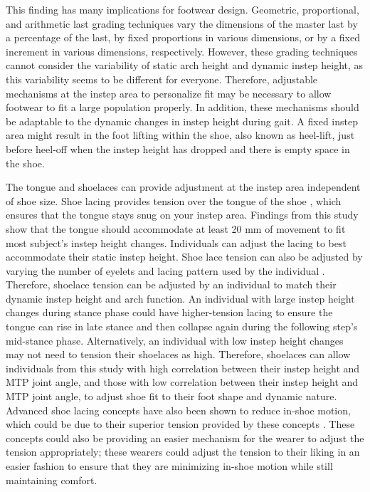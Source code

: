 \documentclass[defaultstyle,11pt]{comps}
\begin{document}
This finding has many implications for footwear design. Geometric, proportional, and arithmetic last grading techniques vary the dimensions of the master last by a percentage of the last, by fixed proportions in various dimensions, or by a fixed increment in various dimensions, respectively.
However, these grading techniques cannot consider the variability of static arch height and dynamic instep height, as this variability seems to be different for everyone.
Therefore, adjustable mechanisms at the instep area to personalize fit may be necessary to allow footwear to fit a large population properly.
In addition, these mechanisms should be adaptable to the dynamic changes in instep height during gait.
A fixed instep area might result in the foot lifting within the shoe, also known as heel-lift, just before heel-off when the instep height has dropped and there is empty space in the shoe.

The tongue and shoelaces can provide adjustment at the instep area independent of shoe size.
Shoe lacing provides tension over the tongue of the shoe \citep{Hagen2009, Polster2002}, which ensures that the tongue stays snug on your instep area.
Findings from this study show that the tongue should accommodate at least 20 mm of movement to fit most subject's instep height changes.
Individuals can adjust the lacing to best accommodate their static instep height.
Shoe lace tension can also be adjusted by varying the number of eyelets and lacing pattern used by the individual \citep{Hagen2009, Hagen2010}.
Therefore, shoelace tension can be adjusted by an individual to match their dynamic instep height and arch function.
An individual with large instep height changes during stance phase could have higher-tension lacing to ensure the tongue can rise in late stance and then collapse again during the following step's mid-stance phase.
Alternatively, an individual with low instep height changes may not need to tension their shoelaces as high.
Therefore, shoelaces can allow individuals from this study with high correlation between their instep height and MTP joint angle, and those with low correlation between their instep height and MTP joint angle, to adjust shoe fit to their foot shape and dynamic nature.
Advanced shoe lacing concepts have also been shown to reduce in-shoe motion, which could be due to their superior tension provided by these concepts \citep{Pryhoda2021, Myers2019}.
These concepts could also be providing an easier mechanism for the wearer to adjust the tension appropriately; these wearers could adjust the tension to their liking in an easier fashion to ensure that they are minimizing in-shoe motion while still maintaining comfort.
\end{document}
